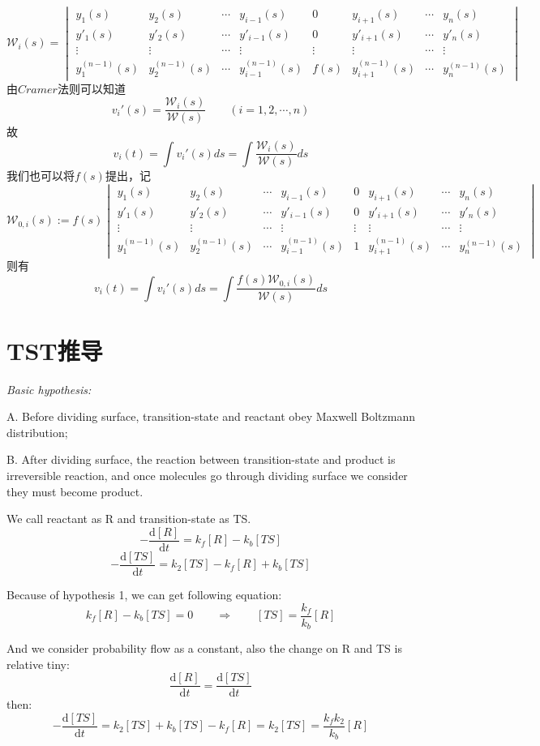\[
\mathcal{W}_i(s)=
\begin{vmatrix}
    y_1(s) & y_2(s) & \cdots & y_{i-1}(s) & 0 & y_{i+1}(s) & \cdots & y_n(s) \\
    y'_1(s) & y'_2(s) & \cdots & y'_{i-1}(s) & 0 & y'_{i+1}(s) & \cdots & y'_n(s) \\
    \vdots & \vdots & \cdots & \vdots & \vdots & \vdots & \cdots & \vdots \\
    y^{(n-1)}_1(s) & y^{(n-1)}_2(s) & \cdots & y^{(n-1)}_{i-1}(s) & f(s) & y^{(n-1)}_{i+1}(s) & \cdots & y^{(n-1)}_n(s)
\end{vmatrix} 
\]
由$Cramer$法则可以知道
\[v_i'(s)=\frac{\mathcal{W}_i(s)}{\mathcal{W}(s)} \qquad (i=1,2,\cdots,n)\]
故
\[v_i(t)=\int v_i'(s)ds=\int \frac{\mathcal{W}_i(s)}{\mathcal{W}(s)}ds\]
我们也可以将$f(s)$提出，记
\[
\mathcal{W}_{0,i}(s):=f(s)
\begin{vmatrix}
    y_1(s) & y_2(s) & \cdots & y_{i-1}(s) & 0 & y_{i+1}(s) & \cdots & y_n(s) \\
    y'_1(s) & y'_2(s) & \cdots & y'_{i-1}(s) & 0 & y'_{i+1}(s) & \cdots & y'_n(s) \\
    \vdots & \vdots & \cdots & \vdots & \vdots & \vdots & \cdots & \vdots \\
    y^{(n-1)}_1(s) & y^{(n-1)}_2(s) & \cdots & y^{(n-1)}_{i-1}(s) & 1 & y^{(n-1)}_{i+1}(s) & \cdots & y^{(n-1)}_n(s)
\end{vmatrix} 
\]
则有
\[v_i(t)=\int v_i'(s)ds=\int \frac{f(s)\mathcal{W}_{0,i}(s)}{\mathcal{W}(s)}ds\]

\section{TST推导}\textit{Basic hypothesis:}

A. Before dividing surface, transition-state and reactant obey Maxwell Boltzmann distribution;

B. After dividing surface, the reaction between transition-state and product is irreversible reaction, and once molecules go through dividing surface we consider they must become product.

We call reactant as R and transition-state as TS.
\[-\frac{\mathrm{d} {[R]}}{\mathrm{d} t} = k_f[R]-k_b[TS] \tag{a}\]
\[-\frac{\mathrm{d} {[TS]}}{\mathrm{d} t} = k_2[TS]-k_f[R]+k_b[TS] \tag{b}\]

Because of hypothesis 1, we can get following equation:
\[k_f[R]-k_b[TS]=0 \qquad \Rightarrow \qquad [TS]=\frac{k_f}{k_b}[R]\]

And we consider probability flow as a constant, also the change on R and TS is relative tiny:
\[\frac{\mathrm{d} {[R]}}{\mathrm{d} t} = \frac{\mathrm{d} {[TS]}}{\mathrm{d} t}\]
then:
\[-\frac{\mathrm{d} {[TS]}}{\mathrm{d} t} = k_2[TS]+k_b[TS]-k_f[R]=k_2[TS]=\frac{k_fk_2}{k_b}[R]\]

